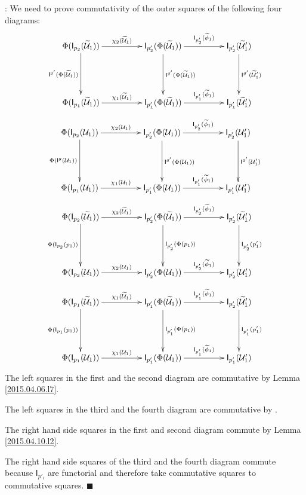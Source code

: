 \documentclass[12pt]{article}
\numberwithin{equation}{section}
\newenvironment{myproof}{{\bf Proof}:}{$\blacksquare$ \vskip 5mm }
\newcommand{\wt}{\widetilde}
\newcommand{\U}{\mathcal{U}}
\newcommand{\I}{\mathsf{I}}
\begin{document}
\begin{myproof}
We need to prove commutativity of the outer squares of the following four diagrams:
%
$$
\begin{xy}
          \xymatrix@C=4pc@R=4pc{
                 \Phi(\I_{p_2}(\wt{\U}_1))  \ar[r]^-{\chi_2(\wt{\U}_1)} \ar[d]_-{\I^{g'}(\Phi(\wt{\U}_1))} & 
                 \I_{p_2'}(\Phi(\wt{\U}_1)) \ar[r]^-{\I_{p_2'}(\wt{\phi}_1)} \ar[d]^-{\I^{g'}(\Phi(\wt{\U}_1))} &
		\I_{p_2'}(\wt{\U}_1') \ar[d]^-{ \I^{g'}(\wt{\U}_1')} \\
		\Phi(\I_{p_1}(\wt{\U}_1))  \ar[r]^-{\chi_1(\wt{\U}_1)} &
		\I_{p_1'}(\Phi(\wt{\U}_1)) \ar[r]^-{\I_{p_1'}(\wt{\phi}_1)} &
		\I_{p_1'}(\wt{\U}_1')
                }
\end{xy}
$$
%
$$
\begin{xy}
          \xymatrix@C=4pc@R=4pc{ \Phi(\I_{p_2}(\U_1)) \ar[r]^-{\chi_2(\U_1)}
            \ar[d]_-{\Phi(\I^g(\U_1))} & \I_{p_2'}(\Phi(\U_1))
            \ar[r]^-{\I_{p_2'}(\wt{\phi}_1)} \ar[d]^-{\I^{g'}(\Phi(\U_1))} &
            \I_{p_2'}(\U_1') \ar[d]^-{\I^{g'}(\U_1')} \\ \Phi(\I_{p_1}(\U_1))
            \ar[r]^-{\chi_1(\U_1)} & \I_{p_1'}(\Phi(\U_1))
            \ar[r]^-{\I_{p_1'}(\wt{\phi}_1)} & \I_{p_1'}(\U_1') }
\end{xy}
$$
%
$$
\begin{xy}
          \xymatrix@C=4pc@R=4pc{ \Phi(\I_{p_2}(\wt{\U}_1))
            \ar[r]^-{\chi_2(\wt{\U}_1)} \ar[d]_-{\Phi(\I_{p_2}(p_1))} &
            \I_{p_2'}(\Phi(\wt{\U}_1)) \ar[r]^-{\I_{p_2'}(\wt{\phi}_1)}
            \ar[d]^-{\I_{p_2'}(\Phi(p_1))} & \I_{p_2'}(\wt{\U}_1')
            \ar[d]^-{\I_{p_2'}(p_1')} \\ \Phi(\I_{p_2}(\U_1))
            \ar[r]^-{\chi_2(\U_1)} & \I_{p_2'}(\Phi(\U_1))
            \ar[r]^-{\I_{p_2'}(\wt{\phi}_1)} & \I_{p_2'}(\U_1') }
\end{xy}
$$
%
$$
\begin{xy}
          \xymatrix@C=4pc@R=4pc{ \Phi(\I_{p_1}(\wt{\U}_1))
            \ar[r]^-{\chi_1(\wt{\U}_1)} \ar[d]_-{\Phi(\I_{p_1}(p_1))} &
            \I_{p_1'}(\Phi(\wt{\U}_1)) \ar[r]^-{\I_{p_1'}(\wt{\phi}_1)}
            \ar[d]^-{\I_{p_1'}(\Phi(p_1))} & \I_{p_2'}(\wt{\U}_1')
            \ar[d]^-{\I_{p_1'}(p_1')} \\ \Phi(\I_{p_1}(\U_1))
            \ar[r]^-{\chi_1(\U_1)} & \I_{p_1'}(\Phi(\U_1))
            \ar[r]^-{\I_{p_1'}(\wt{\phi}_1)} & \I_{p_1'}(\U_1') }
\end{xy}
$$
%
The left squares in the first and the second diagram are commutative by Lemma
\ref{2015.04.06.l7}.

The left squares in the third and the fourth diagram are commutative by
\cite[Lemma 5.7]{fromunivwithPi}.

The right hand side squares in the first and second diagram commute by Lemma
\ref{2015.04.10.l2}.

The right hand side squares of the third and the fourth diagram commute because
$\I_{p'_i}$ are functorial and therefore take commutative squares to commutative
squares.
\end{myproof}
\end{document}
